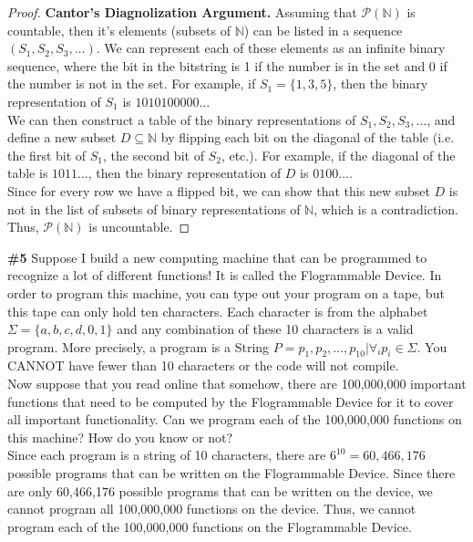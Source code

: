 \documentclass{article}
\newcommand{\problem}[1]{\textbf{\##1}}
\newcommand{\prob}[1]{\problem{#1}}
\newcommand{\AllNaturals}{\mathbb{N}}
\begin{document}
\begin{proof}
    \textbf{Cantor's Diagnolization Argument.} Assuming that \(\mathcal{P}(\AllNaturals)\) is countable, then it's elements (subsets of \(\AllNaturals\)) can be listed in a sequence \((S_1, S_2, S_3, \ldots)\). We can represent each of these elements as an infinite binary sequence, where the bit in the bitstring is 1 if the number is in the set and 0 if the number is not in the set. For example, if \(S_1 = \{1, 3, 5\}\), then the binary representation of \(S_1\) is \(1010100000\ldots\)\\

    We can then construct a table of the binary representations of \(S_1, S_2, S_3, \ldots\), and define a new subset \(D \subseteq \AllNaturals\) by flipping each bit on the diagonal of the table (i.e. the first bit of \(S_1\), the second bit of \(S_2\), etc.). For example, if the diagonal of the table is \(1011\ldots\), then the binary representation of \(D\) is \(0100\ldots\).\\

    Since for every row we have a flipped bit, we can show that this new subset \(D\) is not in the list of subsets of binary representations of \(\AllNaturals\), which is a contradiction. Thus, \(\mathcal{P}(\AllNaturals)\) is uncountable.

\end{proof}

\pagebreak

\prob{5} Suppose I build a new computing machine that can be programmed to recognize a lot of
different functions! It is called the Flogrammable Device. In order to program this machine,
you can type out your program on a tape, but this tape can only hold ten characters. Each
character is from the alphabet \(\Sigma = \{a, b, c, d, 0, 1\}\) and any combination of these 10 characters is a valid program. More precisely, a program is a String \(P = p_1,p_2,\ldots, p_{10} | \forall_i p_i \in \Sigma\). You
CANNOT have fewer than 10 characters or the code will not compile.\\

Now suppose that you read online that somehow, there are 100,000,000 important functions
that need to be computed by the Flogrammable Device for it to cover all important functionality. Can we program each of the 100,000,000 functions on this machine? How do you know
or not?\\

Since each program is a string of 10 characters, there are \(6^{10} = 60,466,176\) possible programs that can be written on the Flogrammable Device. Since there are only 60,466,176 possible programs that can be written on the device, we cannot program all 100,000,000 functions on the device. Thus, we cannot program each of the 100,000,000 functions on the Flogrammable Device.
\end{document}
